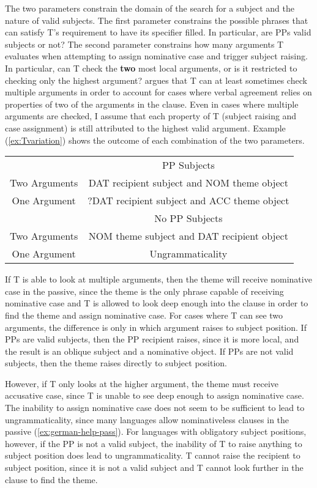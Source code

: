 The two parameters constrain the domain of the search for a subject and the nature of valid subjects. The first parameter constrains the possible phrases that can satisfy T's requirement to have its specifier filled. In particular, are PPs valid subjects or not? The second parameter constrains how many arguments T evaluates when attempting to assign nominative case and trigger subject raising. In particular, can T check the \textbf{two} most local arguments, or is it restricted to checking only the highest argument? \cite{Nevins.2011} argues that T can at least sometimes check multiple arguments in order to account for cases where verbal agreement relies on properties of two of the arguments in the clause. Even in cases where multiple arguments are checked, I assume that each property of T (subject raising and case assignment) is still attributed to the highest valid argument. Example (\ref{ex:Tvariation}) shows the outcome of each combination of the two parameters.

\begin{exe}
	\ex \label{ex:Tvariation}
	\begin{tabular}{cc}
		&	PP Subjects \\
Two Arguments	& DAT recipient subject and NOM theme object \\
One Argument    & ?DAT recipient subject and ACC theme object\\
\hline
	      & No PP Subjects \\
Two Arguments & NOM theme subject and DAT recipient object\\
One Argument  & Ungrammaticality\\
	\end{tabular}
\end{exe}

If T is able to look at multiple arguments, then the theme will receive nominative case in the passive, since the theme is the only phrase capable of receiving nominative case and T is allowed to look deep enough into the clause in order to find the theme and assign nominative case. For cases where T can see two arguments, the difference is only in which argument raises to subject position. If PPs are valid subjects, then the PP recipient raises, since it is more local, and the result is an oblique subject and a nominative object. If PPs are not valid subjects, then the theme raises directly to subject position.

However, if T only looks at the higher argument, the theme must receive accusative case, since T is unable to see deep enough to assign nominative case. The inability to assign nominative case does not seem to be sufficient to lead to ungrammaticality, since many languages allow nominativeless clauses in the passive (\ref{ex:german-help-pass}). For languages with obligatory subject positions, however, if the PP is not a valid subject, the inability of T to raise anything to subject position does lead to ungrammaticality. T cannot raise the recipient to subject position, since it is not a valid subject and T cannot look further in the clause to find the theme.

